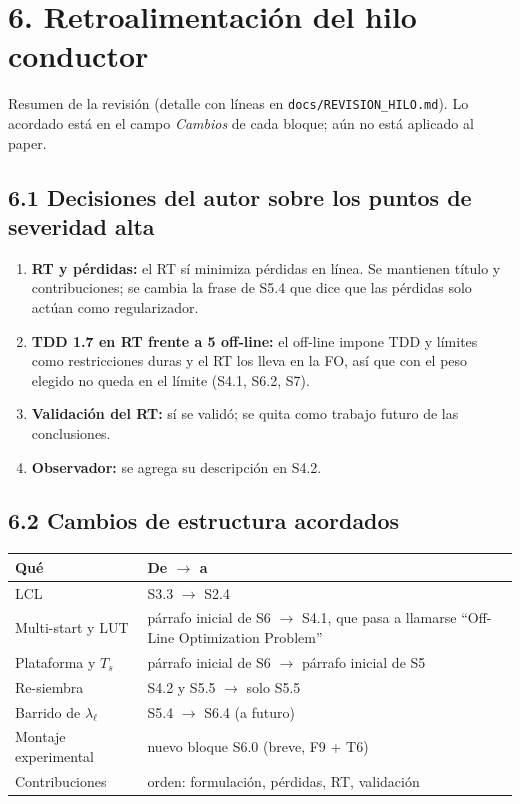 \documentclass[11pt,a4paper]{article}
\newcommand{\pct}{\text{\char`\%}}
\begin{document}
\section*{6. Retroalimentación del hilo conductor}

\noindent Resumen de la revisión (detalle con líneas en
\texttt{docs/REVISION\_HILO.md}). Lo acordado está en el campo
\emph{Cambios} de cada bloque; aún no está aplicado al paper.

\subsection*{6.1 Decisiones del autor sobre los puntos de severidad alta}
\begin{enumerate}[leftmargin=6mm]
\item \textbf{RT y pérdidas:} el RT sí minimiza pérdidas en línea. Se
      mantienen título y contribuciones; se cambia la frase de S5.4 que dice
      que las pérdidas solo actúan como regularizador.
\item \textbf{TDD 1.7\pct{} en RT frente a 5\pct{} off-line:} el off-line
      impone TDD y límites como restricciones duras y el RT los lleva en la
      FO, así que con el peso elegido no queda en el límite (S4.1, S6.2, S7).
\item \textbf{Validación del RT:} sí se validó; se quita como trabajo futuro
      de las conclusiones.
\item \textbf{Observador:} se agrega su descripción en S4.2.
\end{enumerate}

\subsection*{6.2 Cambios de estructura acordados}
\noindent\begin{tabularx}{\textwidth}{lX}
\toprule
\textbf{Qué} & \textbf{De $\rightarrow$ a}\\
\midrule
LCL                          & S3.3 $\rightarrow$ S2.4 \\
Multi-start y LUT            & párrafo inicial de S6 $\rightarrow$ S4.1, que pasa a
                               llamarse ``Off-Line Optimization Problem'' \\
Plataforma y $T_s$           & párrafo inicial de S6 $\rightarrow$ párrafo inicial de S5 \\
Re-siembra                   & S4.2 y S5.5 $\rightarrow$ solo S5.5 \\
Barrido de $\lambda_\ell$    & S5.4 $\rightarrow$ S6.4 (a futuro) \\
Montaje experimental         & nuevo bloque S6.0 (breve, F9 + T6) \\
Contribuciones               & orden: formulación, pérdidas, RT, validación \\
\bottomrule
\end{tabularx}
\end{document}

